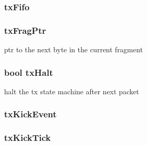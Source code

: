 \label{classNSGigE_a324fed072a29716c20a98a82927bd2a2}
\hypertarget{classNSGigE_ae699c324753236e0a59aa2465920eb46}{
\subsubsection[{txFifo}]{ {\bf txFifo}}}
\label{classNSGigE_ae699c324753236e0a59aa2465920eb46}
\hypertarget{classNSGigE_abc3b072a144aa9509274bb0049bd05dc}{
\subsubsection[{txFragPtr}]{ {\bf txFragPtr}}}
\label{classNSGigE_abc3b072a144aa9509274bb0049bd05dc}
ptr to the next byte in the current fragment \hypertarget{classNSGigE_a057aa0a8537c9c0dc87d423d9398973b}{
\subsubsection[{txHalt}]{\setlength{\rightskip}{0pt plus 5cm}bool {\bf txHalt}}}
\label{classNSGigE_a057aa0a8537c9c0dc87d423d9398973b}
halt the tx state machine after next packet \hypertarget{classNSGigE_aa7f11fd6eeb10e55cdbc1a019f180fcc}{
\subsubsection[{txKickEvent}]{ {\bf txKickEvent}}}
\label{classNSGigE_aa7f11fd6eeb10e55cdbc1a019f180fcc}
\hypertarget{classNSGigE_acfce4fae6fa03f94e3d91d71302fe349}{
\subsubsection[{txKickTick}]{ {\bf txKickTick}}}
